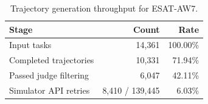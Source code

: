 \begin{table}[t]
\centering
\small
{\begin{tabular}{lrr}
\toprule
\textbf{Stage} & \textbf{Count} & \textbf{Rate} \\
\midrule
Input tasks & 14,361 & 100.00\% \\
Completed trajectories & 10,331 & 71.94\% \\
Passed judge filtering  & 6,047 & 42.11\% \\
\midrule
Simulator API retries & 8,410 / 139,445 & 6.03\% \\
\bottomrule
\end{tabular}
}
\caption{Trajectory generation throughput for \textsc{ESAT}-AW7.}
\label{tab:trajectory_stats}
\end{table}

